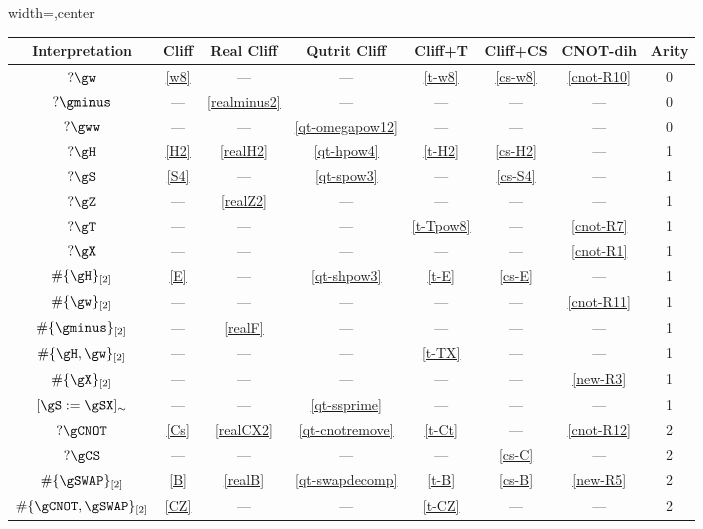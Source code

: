 \documentclass[10pt,a4paper]{article}
\begin{document}
\begin{figure}[ht]
    \begin{threeparttable}
    \begin{adjustbox}{width=\textwidth,center}
    \renewcommand{\arraystretch}{1.2}
    \begin{tabular}{|c|c|c|c|c|c|c|c|}
    \hline
    \textbf{Interpretation} & \textbf{Cliff} & \textbf{Real Cliff} & \textbf{Qutrit Cliff} & \textbf{Cliff+T} & \textbf{Cliff+CS} & \textbf{CNOT-dih} &  \textbf{Arity} \\
    \hline
    $?\gw$ & \eqref{w8} & — & — & \eqref{t-w8}  & \eqref{cs-w8} & \eqref{cnot-R10} & 0\\
    $?\gminus$ & — & \eqref{realminus2} & — & —  & — & — & 0\\
    $?\gww$ & — & — & \eqref{qt-omegapow12} & —  & — & — & 0\\
    \hline
    $?\gH$ & \eqref{H2} & \eqref{realH2} & \eqref{qt-hpow4} & \eqref{t-H2}  & \eqref{cs-H2} & — & 1 \\
    $?\gS$ & \eqref{S4} & — & \eqref{qt-spow3} & — & \eqref{cs-S4} & — & 1 \\
    $?\gZ$ & — & \eqref{realZ2} & — & — & — & — & 1 \\
    $?\gT$ & — & — & — & \eqref{t-Tpow8} & — & \eqref{cnot-R7} & 1 \\
    $?\gX$ & — & — & — & — & — & \eqref{cnot-R1} & 1 \\
    $\#\{\gH\}_{[2]}$ & \eqref{E} & — & \eqref{qt-shpow3} & \eqref{t-E} & \eqref{cs-E} & — & 1 \\
    $\#\{\gw\}_{[2]}$ & — & — & — & — & — & \eqref{cnot-R11} & 1 \\
    $\#\{\gminus\}_{[2]}$ & — & \eqref{realF} & — & — & — & — & 1 \\
    $\#\{\gH, \gw\}_{[2]}$ & — & — & — & \eqref{t-TX} & — & — & 1 \\
    $\#\{\gX\}_{[2]}$ & — & — & — & — & — & \eqref{new-R3} & 1 \\
    $[\gS:=\gSX]_{\sim}$ & — & — & \eqref{qt-ssprime}\tnote{a} & — & — & — & 1 \\
    \hline
    $?\gCNOT$ & \eqref{Cs} & \eqref{realCX2} & \eqref{qt-cnotremove} & \eqref{t-Ct} & — & \eqref{cnot-R12} & 2 \\
    $?\gCS$ & — & — & — & — & \eqref{cs-C} & — & 2 \\
    $\#\{\gSWAP\}_{[2]}$ & \eqref{B} & \eqref{realB} & \eqref{qt-swapdecomp} & \eqref{t-B} & \eqref{cs-B} & \eqref{new-R5} & 2 \\
    $\#\{\gCNOT,\gSWAP\}_{[2]}$ & \eqref{CZ} & —  & — & \eqref{t-CZ} & — & — & 2 \\

\end{tabular}
\end{adjustbox}
\end{threeparttable}
\end{figure}
\end{document}
